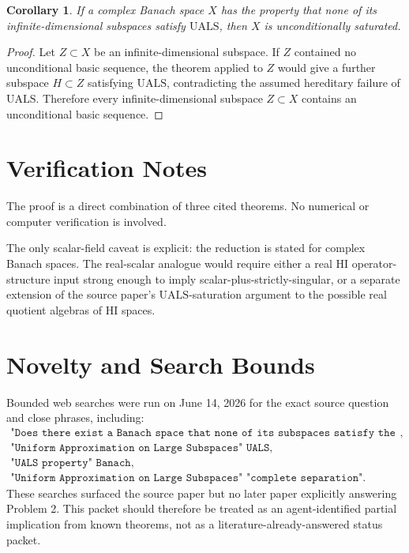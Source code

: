 \documentclass[11pt]{article}
\newtheorem{corollary}{Corollary}
\newcommand{\UALS}{\mathrm{UALS}}
\begin{document}
\begin{corollary}
If a complex Banach space \(X\) has the property that none of its
infinite-dimensional subspaces satisfy \(\UALS\), then \(X\) is
unconditionally saturated.
\end{corollary}

\begin{proof}
Let \(Z\subset X\) be an infinite-dimensional subspace. If \(Z\) contained no
unconditional basic sequence, the theorem applied to \(Z\) would give a further
subspace \(H\subset Z\) satisfying \(\UALS\), contradicting the assumed
hereditary failure of \(\UALS\). Therefore every infinite-dimensional subspace
\(Z\subset X\) contains an unconditional basic sequence.
\end{proof}

\section*{Verification Notes}

The proof is a direct combination of three cited theorems. No numerical or
computer verification is involved.

The only scalar-field caveat is explicit: the reduction is stated for complex
Banach spaces. The real-scalar analogue would require either a real HI
operator-structure input strong enough to imply scalar-plus-strictly-singular,
or a separate extension of the source paper's \(\UALS\)-saturation argument to
the possible real quotient algebras of HI spaces.

\section*{Novelty and Search Bounds}

Bounded web searches were run on June 14, 2026 for the exact source question
and close phrases, including:
\[
\begin{gathered}
\texttt{"Does there exist a Banach space that none of its subspaces satisfy the UALS property"},\\
\texttt{"Uniform Approximation on Large Subspaces" UALS},\\
\texttt{"UALS property" Banach},\\
\texttt{"Uniform Approximation on Large Subspaces" "complete separation"}.
\end{gathered}
\]
These searches surfaced the source paper but no later paper explicitly
answering Problem 2. This packet should therefore be treated as an
agent-identified partial implication from known theorems, not as a
literature-already-answered status packet.
\end{document}
